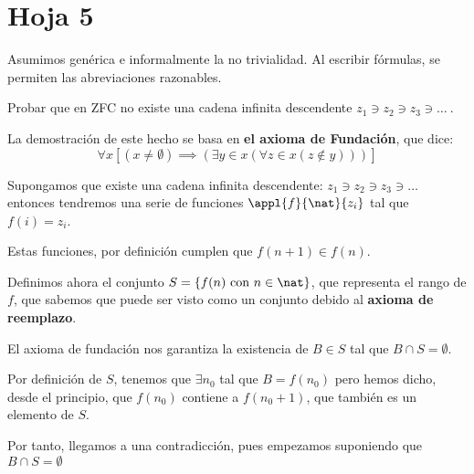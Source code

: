 \section{Hoja 5}

Asumimos gen\'erica e informalmente la no trivialidad. Al escribir f\'ormulas, se permiten
las abreviaciones razonables. 

\begin{problem} 
Probar que en ZFC no existe una cadena infinita descendente $z_1 \ni z_2 \ni z_3 \ni \dots \ $.

\solution

La demostración de este hecho se basa en \textbf{el axioma de Fundación}, que dice:
\[\forall x \left[(x\neq \emptyset)\implies (\exists y \in x (\forall z \in x (z\notin y)))\right]\]

Supongamos que existe una cadena infinita descendente: $z_1 \ni z_2 \ni z_3 \ni \dots \ $ entonces tendremos una serie de funciones $\appl{f}{\nat}{z_i}$ tal que $f(i)=z_i$.

Estas funciones, por definición cumplen que $f(n+1) \in f(n)$.

Definimos ahora el conjunto $S=\{f(n) \text{ con } n\in \nat \}$, que representa el rango de $f$, que sabemos que puede ser visto como un conjunto debido al \textbf{axioma de reemplazo}.

El axioma de fundación nos garantiza la existencia de $B \in S$ tal que $B \cap S = \emptyset$. 

Por definición de $S$, tenemos que $\exists n_0$ tal que $B=f(n_0)$ pero hemos dicho, desde el principio, que $f(n_0)$ contiene a $f(n_0+1)$, que también es un elemento de $S$.

Por tanto, llegamos a una contradicción, pues empezamos suponiendo que $B \cap S = \emptyset$

\end{problem}


